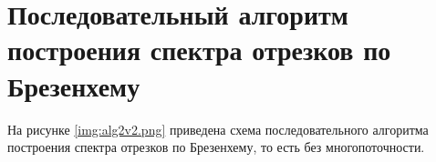 \section{Последовательный алгоритм построения спектра отрезков по Брезенхему}
На рисунке \ref{img:alg2v2.png} приведена схема последовательного алгоритма построения спектра отрезков по Брезенхему, то есть без многопоточности.
\\
\\
\\
\\
\\
\\
\\
\\
\\
\\
\\
\\
\\
\\
\\
\\
\\
\\
\\
\\
\\
\\
\\
\\
\\
\\
\\
\\



\FloatBarrier
